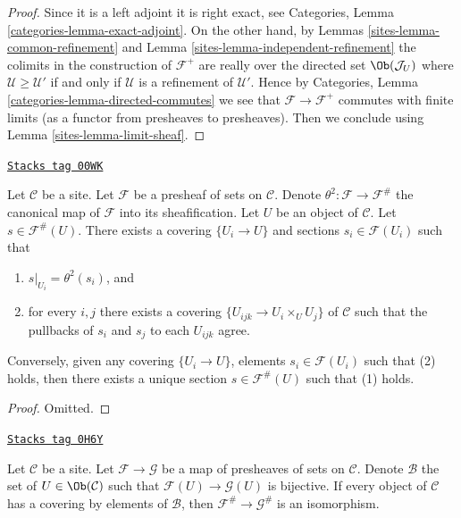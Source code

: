 \begin{proof}

Since it is a left adjoint it is right exact, see
Categories, Lemma \ref{categories-lemma-exact-adjoint}.
On the other hand, by Lemmas \ref{sites-lemma-common-refinement}
and Lemma \ref{sites-lemma-independent-refinement} the colimits
in the construction of $\mathcal{F}^+$ are really over the
directed set $\Ob(\mathcal{J}_U)$ where
$\mathcal{U} \geq \mathcal{U}'$ if and only if
$\mathcal{U}$ is a refinement of $\mathcal{U}'$. Hence by
Categories, Lemma \ref{categories-lemma-directed-commutes}
we see that $\mathcal{F} \to \mathcal{F}^+$ commutes
with finite limits (as a functor from presheaves to
presheaves). Then we conclude using
Lemma \ref{sites-lemma-limit-sheaf}.
\end{proof}

\begin{lemma}
\label{sites-lemma-sections-sheafification}
\href{https://stacks.math.columbia.edu/tag/00WK}{\texttt{Stacks tag 00WK}}

Let $\mathcal{C}$ be a site.
Let $\mathcal{F}$ be a presheaf of sets on $\mathcal{C}$.
Denote $\theta^2 : \mathcal{F} \to \mathcal{F}^\#$ the canonical
map of $\mathcal{F}$ into its sheafification.
Let $U$ be an object of $\mathcal{C}$.
Let $s \in \mathcal{F}^\#(U)$. There exists
a covering $\{U_i \to U\}$ and sections
$s_i \in \mathcal{F}(U_i)$ such that
\begin{enumerate}
\item $s|_{U_i} = \theta^2(s_i)$, and
\item for every $i, j$ there exists a covering
$\{U_{ijk} \to U_i \times_U U_j\}$ of $\mathcal{C}$ such that
the pullbacks of $s_i$ and $s_j$ to each $U_{ijk}$ agree.
\end{enumerate}
Conversely, given any covering $\{U_i \to U\}$, elements
$s_i \in \mathcal{F}(U_i)$ such that (2) holds, then there
exists a unique section $s \in \mathcal{F}^\#(U)$ such
that (1) holds.
\end{lemma}

\begin{proof}
Omitted.
\end{proof}

\begin{lemma}
\label{sites-lemma-isomorphism-sheafifications}
\href{https://stacks.math.columbia.edu/tag/0H6Y}{\texttt{Stacks tag 0H6Y}}

Let $\mathcal{C}$ be a site. Let $\mathcal{F} \to \mathcal{G}$ be a map
of presheaves of sets on $\mathcal{C}$. Denote $\mathcal{B}$ the set of
$U \in \Ob(\mathcal{C})$ such that $\mathcal{F}(U) \to \mathcal{G}(U)$
is bijective. If every object of $\mathcal{C}$ has a covering by elements
of $\mathcal{B}$, then $\mathcal{F}^\# \to \mathcal{G}^\#$ is an isomorphism.
\end{lemma}

